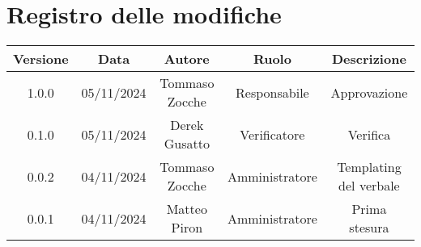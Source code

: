 
\section*{Registro delle modifiche}
\begin{table}[H]
    \begin{tabular}{|c|c|c|c|c|}
        \hline
         \textbf{Versione} &  \textbf{Data} &  \textbf{Autore} &  \textbf{Ruolo} & \textbf{Descrizione} \\
          \hline
          1.0.0 & 05/11/2024 & Tommaso Zocche & Responsabile & Approvazione \\
          \hline
          0.1.0 & 05/11/2024 & Derek Gusatto & Verificatore & Verifica \\
          \hline
          0.0.2 & 04/11/2024 & Tommaso Zocche & Amministratore & Templating del verbale \\
          \hline
          0.0.1 & 04/11/2024 & Matteo Piron & Amministratore & Prima stesura \\
          \hline
    \end{tabular}
\end{table}